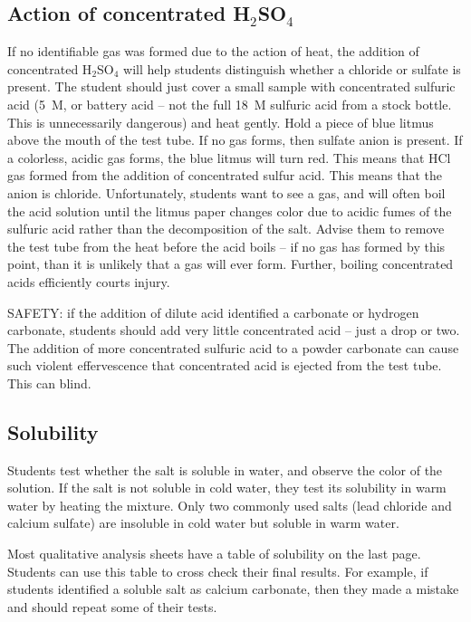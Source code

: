 \subsection{Action of concentrated H$_{2}$SO$_{4}$}
If no identifiable gas was formed due to the action of heat, 
the addition of concentrated H$_{2}$SO$_{4}$ will help students 
distinguish whether a chloride or sulfate is present. 
The student should just cover a small sample 
with concentrated sulfuric acid (5~M, 
or battery acid -- not the full 18~M sulfuric acid from a stock bottle. 
This is unnecessarily dangerous) and heat gently. 
Hold a piece of blue litmus above the mouth of the test tube. 
If no gas forms, 
then sulfate anion is present. 
If a colorless, 
acidic gas forms, 
the blue litmus will turn red. 
This means that HCl gas formed from the addition of concentrated sulfur acid. 
This means that the anion is chloride. 
Unfortunately, 
students want to see a gas, 
and will often boil the acid solution 
until the litmus paper changes color due to 
acidic fumes of the sulfuric acid rather than the decomposition of the salt. 
Advise them to remove the test tube from the heat before the acid boils -- 
if no gas has formed by this point, 
than it is unlikely that a gas will ever form. 
Further, 
boiling concentrated acids efficiently courts injury.

SAFETY: if the addition of dilute acid identified 
a carbonate or hydrogen carbonate, 
students should add very little concentrated acid -- 
just a drop or two. 
The addition of more concentrated sulfuric acid 
to a powder carbonate can cause such violent effervescence 
that concentrated acid is ejected from the test tube. 
This can blind.

\subsection{Solubility}
Students test whether the salt is soluble in water, 
and observe the color of the solution. 
If the salt is not soluble in cold water, 
they test its solubility in warm water by heating the mixture. 
Only two commonly used salts 
(lead chloride and calcium sulfate) are insoluble in cold water 
but soluble in warm water. 

Most qualitative analysis sheets have a table of solubility on the last page. 
Students can use this table to cross check their final results. 
For example, 
if students identified a soluble salt as calcium carbonate, 
then they made a mistake and should repeat some of their tests.

